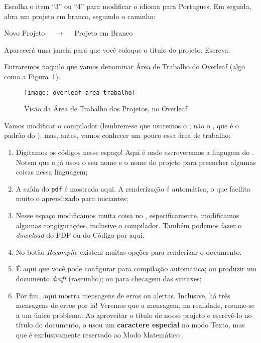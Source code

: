 Escolha o item ``3'' ou ``4'' para modificar o idioma para \textsf{Portugues}.
Em seguida, abra um projeto em branco, seguindo o caminho:

\begin{center}
  \textsf{Novo Projeto} $\quad \longrightarrow \quad$ \textsf{Projeto em Branco}
\end{center}

Aparecerá uma janela para que você coloque o título do projeto.
Escreva:


Entraremos naquilo que vamos denominar {\sffamily Área de Trabalho do Overleaf}
(algo como a Figura~\ref{fig:overleaf_desktop}).

\begin{figure}[!htbp]
  \centering
  \texttt{[image: overleaf\_area-trabalho]}
  \caption{Visão da Área de Trabalho dos Projetos, no Overleaf}
  \label{fig:overleaf_desktop}
\end{figure}

Vamos modificar o compilador (lembrem-se que usaremos o \lualatex; não o 
\pdflatex{}, que é o padrão do \Overleaf), mas, antes, vamos conhecer 
um pouco essa área de trabalho:

\begin{enumerate}
  \item Digitamos os códigos nesse espaço! 
        Aqui é onde escreveremos a lingugem do .
        Notem que o \Overleaf{} já usou o seu nome e o nome do projeto para 
        preencher algumas coisas nessa linguagem;
  \item A saída do \texttt{pdf} é mostrada aqui.
        A renderização é automática, o que facilita muito o aprendizado para 
        iniciantes;
  \item Nesse espaço modificamos muita coisa no \Overleaf{}, especificamente, 
        modificamos algumas congigurações, inclusive o \textsf{compilador}.
        Também podemos fazer o \textit{download} do PDF ou do Código por aqui.
  \item No botão \textit{Recompile} existem muitas opções para renderizar o 
        documento.
  \item É aqui que você pode configurar para compilação automática; ou produzir
        um documento \textit{draft} (rascunho); ou para checagem das sintaxes;
  \item Por fim, aqui mostra mensagens de erros ou alertas. 
        Inclusive, há três mensagens de erros por lá! 
        Veremos que a mensagem, na realidade, resume-se a um único problema: 
        Ao aproveitar o título de nosso projeto e escrevê-lo no título do 
        documento, o \Overleaf{} usou um \textbf{caractere especial} no modo 
        \textsf{Texto}, mas que é exclusivamente reservado ao 
        \textsf{Modo Matemático} .
\end{enumerate}

